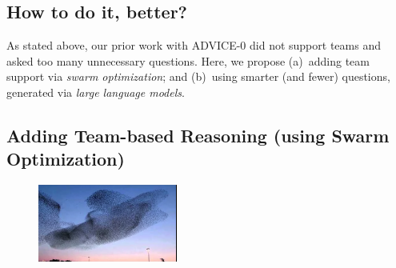 \documentclass[twoside]{NSF}
\newcommand{\IT}{{\sffamily {\em \mbox{ADVICE}}}}
\newcommand{\ITS}[1]{\mbox{{\IT}-#1}}
\begin{document}
\begin{nsfdescription}
    

\section{How to do it, better? }\label{better}
 As stated above, our prior work with ADVICE-0 did not support teams and asked too many unnecessary questions. Here, we propose (a)~adding team support via {\em swarm optimization}; and (b)~using
 smarter (and fewer) questions, generated   via {\em large language models}.


 
 
 
\subsection{ Adding Team-based Reasoning (using Swarm Optimization)}\label{teams}


 \begin{figure}
 \includegraphics[width=1.8in]{fig/starlings.png}
 \end{figure} 


\end{nsfdescription}
\end{document}
